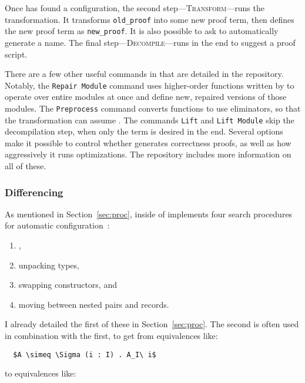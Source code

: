 Once \toolnamec has found a configuration, the second step---\textsc{Transform}---runs the transformation.
It transforms \lstinline{old_proof} into some new proof term, then defines the new proof term as \lstinline{new_proof}.
It is also possible to ask \toolnamec to automatically generate a name. %
The final step---\textsc{Decompile}---runs in the end to suggest a proof script.

There are a few other useful commands in \toolnamec that are detailed in the repository.
Notably, the \lstinline{Repair Module} command uses higher-order functions written by 
to operate over entire modules at once and define new, repaired versions of those modules.
The \lstinline{Preprocess} command converts functions to use eliminators, so that the transformation
can assume .
The commands \lstinline{Lift} and \lstinline{Lift Module} skip the decompilation step,
when only the term is desired in the end.
Several options make it possible to control whether \toolnamec generates correctness proofs,
as well as how aggressively it runs optimizations.
The repository includes more information on all of these.

\subsubsection{Differencing}
\label{sec:pi-details-diff}

As mentioned in Section~\ref{sec:proc},  inside of
\toolnamec implements four search procedures for automatic configuration~\href{https://github.com/uwplse/pumpkin-pi/blob/v2.0.0/plugin/src/automation/lift/liftconfig.ml}{}:

\begin{enumerate}
\item {},
\item unpacking \kl{$\Sigma$} types,
\item swapping constructors, and
\item moving between nested pairs and records.
\end{enumerate}
I already detailed the first of these in Section~\ref{sec:proc}.
The second is often used in combination with the first, to get from equivalences like:

\begin{lstlisting}
  $A \simeq \Sigma (i : I) . A_I\ i$
\end{lstlisting}
to equivalences like:

